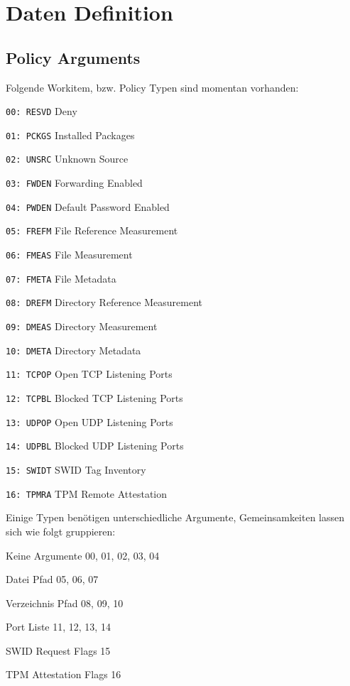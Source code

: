 \documentclass[10pt,a4paper]{scrartcl}
\begin{document}
 
\pagebreak


\section{Daten Definition}

\subsection{Policy Arguments}

Folgende Workitem, bzw. Policy Typen sind momentan vorhanden:
\begin{description*}
	\item[\texttt{00: RESVD}] Deny
	\item[\texttt{01: PCKGS}] Installed Packages
	\item[\texttt{02: UNSRC}] Unknown Source
	\item[\texttt{03: FWDEN}] Forwarding Enabled
	\item[\texttt{04: PWDEN}] Default Password Enabled
	\item[\texttt{05: FREFM}] File Reference Measurement
	\item[\texttt{06: FMEAS}] File Measurement 
	\item[\texttt{07: FMETA}] File Metadata
	\item[\texttt{08: DREFM}] Directory Reference Measurement
	\item[\texttt{09: DMEAS}] Directory Measurement
	\item[\texttt{10: DMETA}] Directory Metadata
	\item[\texttt{11: TCPOP}] Open TCP Listening Ports
	\item[\texttt{12: TCPBL}] Blocked TCP Listening Ports
	\item[\texttt{13: UDPOP}] Open UDP Listening Ports
	\item[\texttt{14: UDPBL}] Blocked UDP Listening Ports
	\item[\texttt{15: SWIDT}] SWID Tag Inventory
	\item[\texttt{16: TPMRA}] TPM Remote Attestation
\end{description*}

Einige Typen benötigen unterschiedliche Argumente, Gemeinsamkeiten lassen sich
wie folgt gruppieren:

\begin{description*}
	\item[Keine Argumente] 00, 01, 02, 03, 04
	\item[Datei Pfad] 05, 06, 07
	\item[Verzeichnis Pfad] 08, 09, 10
	\item[Port Liste] 11, 12, 13, 14
	\item[SWID Request Flags] 15
	\item[TPM Attestation Flags] 16
\end{description*}
\end{document}
